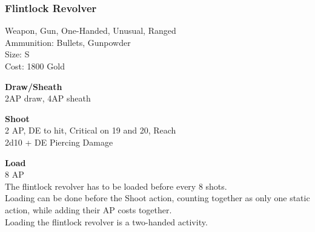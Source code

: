 \subsubsection{Flintlock Revolver}\label{weapon:flintlockRevolver}
Weapon, Gun, One-Handed, Unusual, Ranged\\
Ammunition: Bullets, Gunpowder\\
Size: S\\
Cost: 1800 Gold

\textbf{Draw/Sheath} \\
2AP draw, 4AP sheath

\textbf{Shoot} \\
2 AP, DE to hit, Critical on 19 and 20,  Reach\\
2d10 + DE Piercing Damage

\textbf{Load} \\
8 AP\\
The flintlock revolver has to be loaded before every 8 shots.\\
Loading can be done before the Shoot action, counting together as only one static action, while adding their AP costs together.\\
Loading the flintlock revolver is a two-handed activity.
